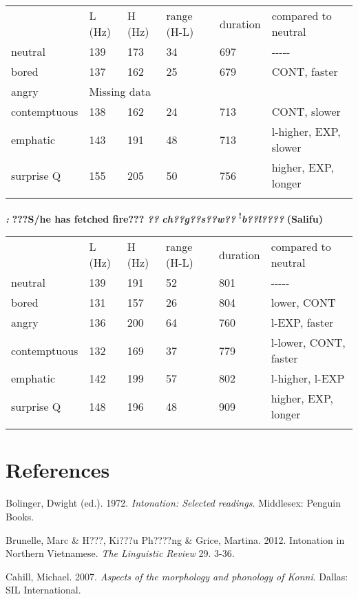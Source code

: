 \documentclass[output=paper]{langsci/langscibook}
\begin{document}
\begin{tabularx}{\textwidth}{XXXXXX} & L (Hz) & H (Hz) & range (H-L) & duration & compared to neutral\\
\lsptoprule
neutral & 139 & 173 & 34 & 697 & {}-{}-{}-{}-{}-\\
bored & 137 & 162 & 25 & 679 & CONT, faster\\
angry & \multicolumn{5}{l}{ Missing data}\\
contemptuous & 138 & 162 & 24 & 713 & CONT, slower\\
emphatic & 143 & 191 & 48 & 713 & l-higher, EXP, slower\\
surprise Q & 155 & 205 & 50 & 756 & higher, EXP, longer\\
\lspbottomrule
\end{tabularx}
\emph{\textbf{\textup{:}}}\textbf{  ???S}\textbf{/he has fetched fire???  }\emph{\textbf{??}}\emph{\textbf{ ch??g??s??}}\emph{\textbf{w??}}\emph{\textbf{ }}\textbf{\textsuperscript{!}}\emph{\textbf{b??l????}}\textbf{  (Salifu)}

\begin{tabularx}{\textwidth}{XXXXXX} & L (Hz) & H (Hz) & range (H-L) & duration & compared to neutral\\
\lsptoprule
neutral & 139 & 191 & 52 & 801 & {}-{}-{}-{}-{}-\\
bored & 131 & 157 & 26 & 804 & lower, CONT\\
angry & 136 & 200 & 64 & 760 & l-EXP, faster\\
contemptuous & 132 & 169 & 37 & 779 & l-lower, CONT, faster\\
emphatic & 142 & 199 & 57 & 802 & l-higher, l-EXP\\
surprise Q & 148 & 196 & 48 & 909 & higher, EXP, longer\\
\lspbottomrule
\end{tabularx}
\section{References}

Bolinger, Dwight (ed.). 1972. \textit{Intonation: Selected readings. }Middlesex: Penguin Books.



Brunelle, Marc \& H???, Ki???u Ph????ng \& Grice, Martina. 2012. Intonation in Northern Vietnamese. \textit{The Linguistic Review} 29. 3-36. 



Cahill, Michael. 2007. \emph{Aspects of the morphology and phonology of Konni}. Dallas: SIL International.
\end{document}
